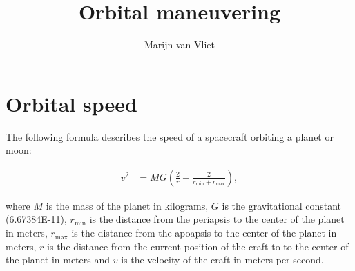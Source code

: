 \documentclass[a4paper, 11pt]{rodin}
\author{Marijn van Vliet}
\title{Orbital maneuvering}
\begin{document}
\maketitle

\section{Orbital speed}\label{orbital_speed}

The following formula describes the speed of a spacecraft orbiting a planet or moon:
\begin{center}
\end{center}
\begin{align}
    v^2 &= MG \left( \frac{2}{r} - \frac{2}{r_\mathrm{min} + r_\mathrm{max}} \right),
\end{align}

where $M$ is the mass of the planet in kilograms, $G$ is the gravitational constant (\num{6.67384E-11}), $r_\mathrm{min}$ is the distance from the periapsis to the center of the planet in meters, $r_\mathrm{max}$ is the distance from the apoapsis to the center of the planet in meters, $r$ is the distance from the current position of the craft to to the center of the planet in meters and $v$ is the velocity of the craft in meters per second. 
\end{document}
